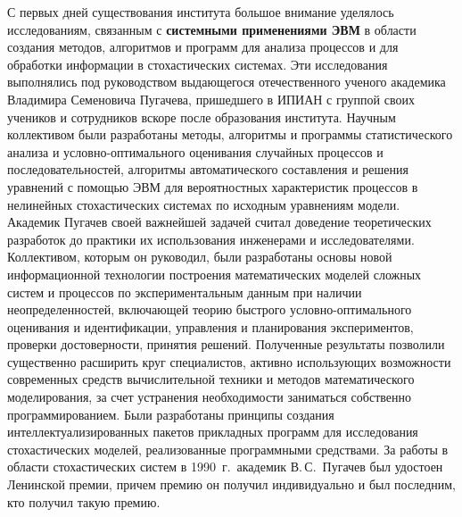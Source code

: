 \begin{multicols}{2}
     С первых дней существования института большое внимание
уделялось исследованиям, связанным с \textbf{системными
применениями ЭВМ} в области созда\-ния методов, алгоритмов и
программ для %
 анализа процессов и для обработки информации в
стоха\-сти\-че\-ских системах. Эти исследования выполнялись под
руководством выдающегося отечественного ученого академика
Владимира Семеновича Пугачева, пришедшего в ИПИАН с группой
своих учеников и сотрудников вскоре после образования института.
Научным коллективом были разработаны методы, алгоритмы и
программы статистического анализа и услов\-но-оп\-ти\-маль\-но\-го
оценивания случайных процессов и последовательностей,
алгоритмы автоматического составления и решения уравнений с
помощью ЭВМ для вероятностных характеристик процессов в
нелинейных стохастических системах по исходным уравнениям
модели. Академик Пугачев своей важнейшей задачей считал
доведение теоретических разработок до практики их использования
инженерами и исследователями. Коллективом, которым он
руководил, были разработаны основы новой информационной
технологии построения математических моделей сложных систем и
процессов по экспериментальным данным при наличии
неопределенностей, вклю\-ча\-ющей тео\-рию быстрого
     услов\-но-оп\-ти\-маль\-но\-го оценивания и идентификации,
управления и планирования экспериментов, проверки
достоверности, принятия решений. Полученные результаты
позволили существенно расширить круг специалистов, активно
использующих воз\-мож\-но\-сти современных средств вычислительной
техники и методов математического моделирования, за счет
устранения необходимости заниматься собственно
программированием. Были разработаны принципы создания
интел\-лек\-ту\-а\-ли\-зи\-ро\-ван\-ных пакетов прикладных программ для
исследования стохастических моделей, реализованные
программными средствами. За работы в области стохастических
систем в 1990~г.\ академик В.\,С.~Пугачев был удостоен
Ленинской премии, причем премию он получил индивидуально и
был последним, кто получил такую премию.
{

}


\end{multicols}
